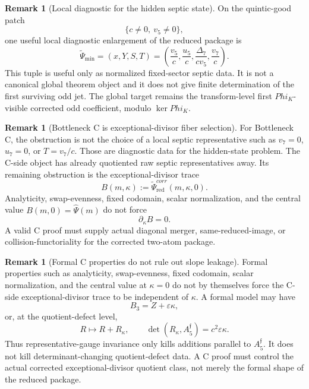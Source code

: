 \documentclass[11pt,a4paper]{amsart}
\def\Phi{Phi}%
\def\corr{corr}%
\theoremstyle{plain}
\theoremstyle{definition}
\newtheorem{remark}[theorem]{Remark}
\newcommand{\corr}{\mathrm{corr}}
\begin{document}
\begin{remark}[Local diagnostic for the hidden septic state]
\label{rem:local-diagnostic-hidden-septic-state}
On the quintic-good patch
\[
\{c\ne0,\ v_5\ne0\},
\]
one useful local diagnostic enlargement of the reduced package is
\[
\widetilde\Psi_{\min}=(x,Y,S,T)
=
\left(
\frac{v_5}{c},
\frac{u_5}{c},
\frac{\Delta_7}{cv_5},
\frac{v_7}{c}
\right).
\]
This tuple is useful only as normalized fixed-sector septic data.  It is
not a canonical global theorem object and it does not give finite
determination of the first surviving odd jet.  The global target remains
the transform-level first \(\Phi_K\)-visible corrected odd coefficient,
modulo \(\ker\Phi_K\).
\end{remark}

\begin{remark}[Bottleneck C is exceptional-divisor fiber selection]
\label{rem:bottleneck-c-exceptional-divisor-fiber-selection}
For Bottleneck C, the obstruction is not the choice of a local septic
representative such as \(v_7=0\), \(u_7=0\), or \(T=v_7/c\).  Those are
diagnostic data for the hidden-state problem.  The C-side object has
already quotiented raw septic representatives away.  Its remaining
obstruction is the exceptional-divisor trace
\[
B(m,\kappa):=\widetilde\Psi^{\corr}_{\mathrm{red}}(m,\kappa,0).
\]
Analyticity, swap-evenness, fixed codomain, scalar normalization, and the
central value \(B(m,0)=\widehat\Psi(m)\) do not force
\[
\partial_\kappa B=0.
\]
A valid C proof must supply actual diagonal merger, same-reduced-image, or
collision-functoriality for the corrected two-atom package.
\end{remark}

\begin{remark}[Formal C properties do not rule out slope leakage]
\label{rem:formal-c-properties-do-not-rule-out-slope-leakage}
Formal properties such as analyticity, swap-evenness, fixed codomain,
scalar normalization, and the central value at \(\kappa=0\) do not by
themselves force the C-side exceptional-divisor trace to be independent
of \(\kappa\).  A formal model may have
\[
B_3=Z+\varepsilon\kappa,
\]
or, at the quotient-defect level,
\[
R\longmapsto R+R_\kappa,
\qquad
\det(R_\kappa,A_5^{\mathfrak f})=c^2\varepsilon\kappa.
\]
Thus representative-gauge invariance only kills additions parallel to
\(A_5^{\mathfrak f}\).  It does not kill determinant-changing
quotient-defect data.  A C proof must control the actual corrected
exceptional-divisor quotient class, not merely the formal shape of the
reduced package.
\end{remark}
\end{document}
